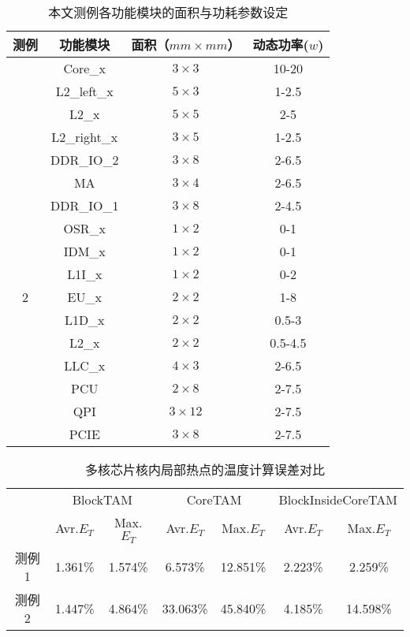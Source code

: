 \begin{table}
\centering
\caption{本文测例各功能模块的面积与功耗参数设定}
\begin{tabular}{c c c c}
\hline\hline
测例 & 功能模块 & 面积（$mm \times mm$） & 动态功率($w$) \\
\hline
 & Core\_x & $3\times 3$ & 10-20 \\

 & L2\_left\_x & $5\times 3$ & 1-2.5 \\
\raisebox{1.5ex}{1}
 & L2\_x & $5\times 5$ & 2-5 \\
 & L2\_right\_x & $3\times 5$ & 1-2.5 \\
\hline
 & DDR\_IO\_2 & $3 \times 8$ & 2-6.5 \\
 & MA & $3 \times 4$ & 2-6.5 \\
 & DDR\_IO\_1 & $3 \times 8$ & 2-4.5 \\
 & OSR\_x & $1 \times 2$ & 0-1 \\
 & IDM\_x & $1 \times 2$ & 0-1 \\
 & L1I\_x & $1 \times 2$ & 0-2 \\
2 & EU\_x & $2 \times 2$ & 1-8 \\
 & L1D\_x & $2 \times 2$ & 0.5-3 \\
 & L2\_x & $2 \times 2$ & 0.5-4.5 \\
 & LLC\_x & $4 \times 3$ & 2-6.5 \\
 & PCU & $2 \times 8$ & 2-7.5 \\
 & QPI & $3 \times 12$ & 2-7.5 \\
 & PCIE & $3 \times 8$ & 2-7.5 \\
\hline
\end{tabular}
\label{tab:chap5:exp-flp-parameters}
\end{table}


\begin{table}
\centering
\caption{多核芯片核内局部热点的温度计算误差对比}
\begin{tabular}{c c c c c c c}
\hline\hline
 & \multicolumn{2}{c}{BlockTAM} & \multicolumn{2}{c}{CoreTAM} & \multicolumn{2}{c}{BlockInsideCoreTAM} \\
 & Avr.$E_T$ & Max.$E_T$ & Avr.$E_T$ & Max.$E_T$ & Avr.$E_T$ & Max.$E_T$ \\
 \hline
测例1 & 1.361\% & 1.574\% & 6.573\% & 12.851\% & 2.223\% & 2.259\% \\
\hline
测例2 & 1.447\% & 4.864\% & 33.063\% & 45.840\% & 4.185\% & 14.598\% \\
\hline
\end{tabular}
\label{tab:chap5:temp-error}
\end{table}

